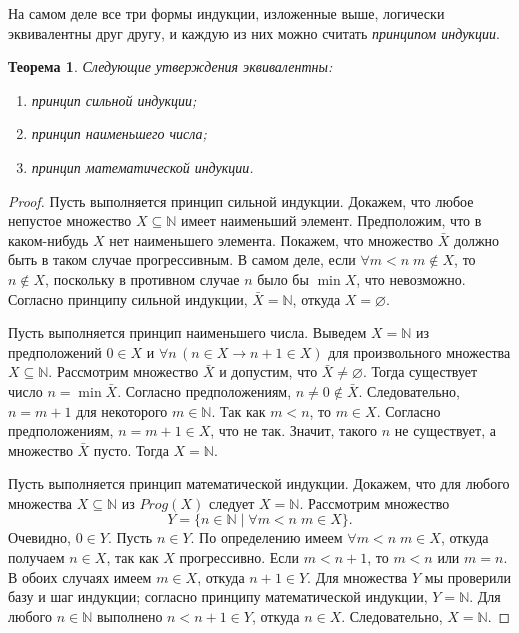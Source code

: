 \documentclass[12pt,notitlepage]{article}
\theoremstyle{plain}
\newtheorem{thm}{Теорема}[section]
\theoremstyle{definition}
\theoremstyle{plain}
\newcommand{\N}{\mathbb{N}}
\newcommand{\sbs}{\subseteq}
\newcommand{\void}{\varnothing}
\newcommand{\1}{\mathbf{1}}
\newcommand{\0}{\mathbf{0}}
\newcommand{\mcomm}[1]{}
\begin{document}
На самом деле все три формы индукции, изложенные выше, логически эквивалентны друг другу, и каждую из них можно считать \emph{принципом индукции}.
\begin{thm}
	Следующие утверждения эквивалентны:
	\begin{enumerate}
		\item принцип сильной индукции;
		\item принцип наименьшего числа;
		\item принцип математической индукции.
	\end{enumerate}
\end{thm}
\mcomm{We use straightforward but abstract logical manipulations in order to prove this theorem. They pose a serious challenge for many students. Nevertheless, we prefer to make the students ``eat the frog'' now---just spending more time on this proof. In my experience, the `predicate' version of this proof is no better, whereas the `predicate' forms of the induction principle might be so for some audiences.}
\begin{proof}
	Пусть выполняется принцип сильной индукции. Докажем, что любое непустое множество $X \sbs \N$ имеет наименьший элемент. Предположим, что в каком-нибудь $X$ нет наименьшего элемента. Покажем, что множество $\bar X$ должно быть в таком случае прогрессивным. В самом деле, если $\forall m < n\; m \notin X$, то $n \notin X$, поскольку в противном случае $n$ было бы $\min X$, что невозможно. Согласно принципу сильной индукции, $\bar X = \N$, откуда $X = \void$.
	
	Пусть выполняется принцип наименьшего числа. Выведем $X = \N$ из предположений $0 \in X$ и $\forall n\, (n \in X \to n+1 \in X)$ для произвольного множества $X \sbs \N$. Рассмотрим множество $\bar X$ и допустим, что $\bar X \neq \void$. Тогда существует число $n = \min \bar X$. Согласно предположениям, $n \neq 0 \notin \bar X$. Следовательно, $n = m + 1$ для некоторого $m \in \N$. Так как $m < n$, то $m \in X$. Согласно предположениям, $n = m + 1  \in X$, что не так. Значит, такого $n$ не существует, а множество $\bar X$ пусто. Тогда $X = \N$.
	
	Пусть выполняется принцип математической индукции. Докажем, что для любого множества $X \sbs \N$ из $Prog(X)$ следует $X =\N$. Рассмотрим множество
	$$Y = \{ n \in \N \mid \forall m < n\; m \in X \}.$$
	Очевидно, $0 \in Y$. Пусть $n \in Y$. По определению имеем $\forall m < n\; m \in X$, откуда получаем $n \in X$, так как $X$ прогрессивно. Если $m < n + 1$, то $m < n$ или $m = n$. В обоих случаях имеем $m \in X$, откуда $n + 1\in Y$. Для множества $Y$ мы проверили базу и шаг индукции; согласно принципу математической индукции, $Y = \N$. Для любого $n \in \N$ выполнено $n < n + 1 \in Y$, откуда $n \in X$. Следовательно, $X = \N$.
\end{proof}
\end{document}
